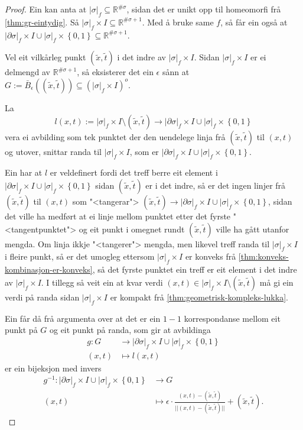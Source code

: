 \documentclass[a4paper, 12pt, norsk]{article}
\theoremstyle{plain}
\theoremstyle{definition}
\newcommand{\Rb}{\mathbb{R}}
\newcommand{\union}{ \mathop{\cup}\limits }
\newcommand{\gr}[1]{ \lvert #1 \rvert } %
\newcommand{\set}[1]{ \left\{ #1 \right\} } %
\newcommand{\tuple}[1]{ \left( #1 \right) } %
\begin{document}
\begin{proof}
	Ein kan anta at \( \gr{\sigma}_f \subseteq \Rb^{\#\sigma} \), sidan det er unikt opp til homeomorfi frå \autoref{thm:gr-eintydig}. Så \( \gr{\sigma}_f \times I \subseteq \Rb^{\#\sigma+1} \). Med å bruke same \( f \), så får ein også at \( \gr{\partial\sigma}_f \times I \union \gr{\sigma}_f \times \set{0, 1} \subseteq \Rb^{\#\sigma+1} \).

	Vel eit vilkårleg punkt \( \tuple{\tilde{x}, \tilde{t}} \) i det indre av \( \gr{\sigma}_f \times I \). Sidan \( \gr{\sigma}_f \times I \) er ei delmengd av \( \Rb^{\#\sigma+1} \), så eksisterer det ein \( \epsilon \) sånn at \( G := \bar{B}_{\epsilon}\tuple{\tuple{\tilde{x}, \tilde{t}}} \subseteq \tuple{\gr{\sigma}_f \times I}^o \).
	
	La
	\[
		l(x,t) := \gr{\sigma}_f \times I \setminus \tuple{\tilde{x}, \tilde{t}} \to \gr{\partial\sigma}_f \times I \union \gr{\sigma}_f \times \set{0, 1}
	\] 
	vera ei avbilding som tek punktet der den uendelege linja frå \( \tuple{\tilde{x}, \tilde{t}} \) til \( \tuple{x,t} \) og utover, snittar randa til \( \gr{\sigma}_f \times I \), som er \( \gr{\partial\sigma}_f \times I \union \gr{\sigma}_f \times \set{0, 1} \).

	Ein har at \( l \) er veldefinert fordi det treff berre eit element i \( \gr{\partial\sigma}_f \times I \union \gr{\sigma}_f \times \set{0, 1} \) sidan \( \tuple{\tilde{x}, \tilde{t}} \) er i det indre, så er det ingen linjer frå \( \tuple{\tilde{x}, \tilde{t}} \) til \( \tuple{x,t} \) som "<tangerar"> \( \tuple{\tilde{x}, \tilde{t}} \to \gr{\partial\sigma}_f \times I \union \gr{\sigma}_f \times \set{0, 1} \), sidan det ville ha medført at ei linje mellom punktet etter det fyrste "<tangentpunktet"> og eit punkt i omegnet rundt \( \tuple{\tilde{x}, \tilde{t}} \) ville ha gått utanfor mengda. Om linja ikkje "<tangerer"> mengda, men likevel treff randa til \( \gr{\sigma}_f \times I \) i fleire punkt, så er det umogleg ettersom \( \gr{\sigma}_f \times I \) er konveks frå \autoref{thm:konveks-kombinasjon-er-konveks}, så det fyrste punktet ein treff er eit element i det indre av \( \gr{\sigma}_f \times I \). I tillegg så veit ein at kvar verdi \( (x,t) \in \gr{\sigma}_f \times I \setminus \tuple{\tilde{x}, \tilde{t}} \) må gi ein verdi på randa sidan \( \gr{\sigma}_f \times I \) er kompakt frå \autoref{thm:geometrisk-kompleks-lukka}.

	Ein får då frå argumenta over at det er ein \( 1 - 1 \) korrespondanse mellom eit punkt på \( G \) og eit punkt på randa, som gir at avbildinga
	\begin{align*}
		g: G &\to \gr{\partial\sigma}_f \times I \union \gr{\sigma}_f \times \set{0, 1} \\
		(x, t) &\mapsto l(x,t)
	\end{align*}
	er ein bijeksjon med invers
	\begin{align*}
		g^{-1}: \gr{\partial\sigma}_f \times I \union \gr{\sigma}_f \times \set{0, 1} &\to G \\
		(x, t) &\mapsto \epsilon\cdot\frac{(x,t)-\tuple{\tilde{x}, \tilde{t}}}{||(x,t)-\tuple{\tilde{x}, \tilde{t}}||} + \tuple{\tilde{x}, \tilde{t}}.
	\end{align*}
	

\end{proof}
\end{document}
